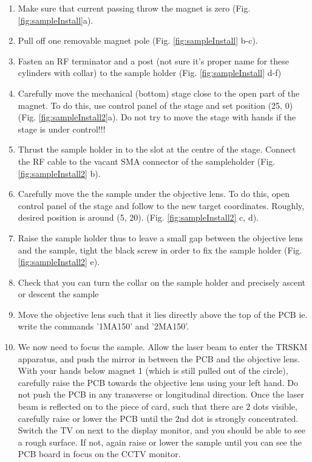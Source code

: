 \documentclass[14pt,a4paper] {article}
\begin{document}
\begin{enumerate}
\item Make sure that current passing throw the magnet is zero (Fig. \ref{fig:sampleInstall}a).

\item Pull off one removable magnet pole (Fig. \ref{fig:sampleInstall} b-c).

\item Fasten an RF terminator and a post (not sure it's proper name for these cylinders with collar) to the sample holder (Fig.  \ref{fig:sampleInstall} d-f)

\item Carefully move the mechanical (bottom) stage close to the open part of the magnet. To do this, use control panel of the stage and set position (25, 0) (Fig. \ref{fig:sampleInstall2}a). Do not try to move the stage with hands if the stage is under control!!!
 
\item Thrust the sample holder in to the slot at the centre of the stage. Connect the RF cable to the vacant SMA connector of the sampleholder (Fig. \ref{fig:sampleInstall2} b).

\item Carefully move the the sample under the objective lens. To do this, open control panel of the stage and follow to the new target coordinates. Roughly, desired position is around (5, 20). (Fig. \ref{fig:sampleInstall2} c, d).  
 
\item Raise the sample holder thus to leave a small gap between the objective lens and the sample, tight the black screw in order to fix the sample holder (Fig. \ref{fig:sampleInstall2} e).

\item Check that you can turn the collar on the sample holder and precisely ascent or descent the sample   

\item Move the objective lens such that it lies directly above the top of the PCB ie. write the commands '1MA150' and '2MA150'.

\item We now need to focus the sample. Allow the laser beam to enter the TRSKM apparatus, and push the mirror in between the PCB and the objective lens. With your hands below magnet 1 (which is still pulled out of the circle), carefully raise the PCB towards the objective lens using your left hand. Do not push the PCB in any transverse or longitudinal direction. Once the laser beam is reflected on to the piece of card, such that there are 2 dots visible, carefully raise or lower the PCB until the 2nd dot is strongly concentrated. Switch the TV on next to the display monitor, and you should be able to see a rough surface. If not, again raise or lower the sample until you can see the PCB board in focus on the CCTV monitor.


\end{enumerate}
\end{document}
